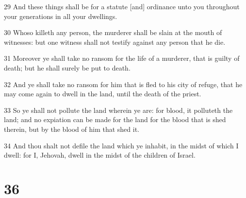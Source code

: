\par 29 And these things shall be for a statute [and] ordinance unto you throughout your generations in all your dwellings.
\par 30 Whoso killeth any person, the murderer shall be slain at the mouth of witnesses: but one witness shall not testify against any person that he die.
\par 31 Moreover ye shall take no ransom for the life of a murderer, that is guilty of death; but he shall surely be put to death.
\par 32 And ye shall take no ransom for him that is fled to his city of refuge, that he may come again to dwell in the land, until the death of the priest.
\par 33 So ye shall not pollute the land wherein ye are: for blood, it polluteth the land; and no expiation can be made for the land for the blood that is shed therein, but by the blood of him that shed it.
\par 34 And thou shalt not defile the land which ye inhabit, in the midst of which I dwell: for I, Jehovah, dwell in the midst of the children of Israel.

\chapter{36}

